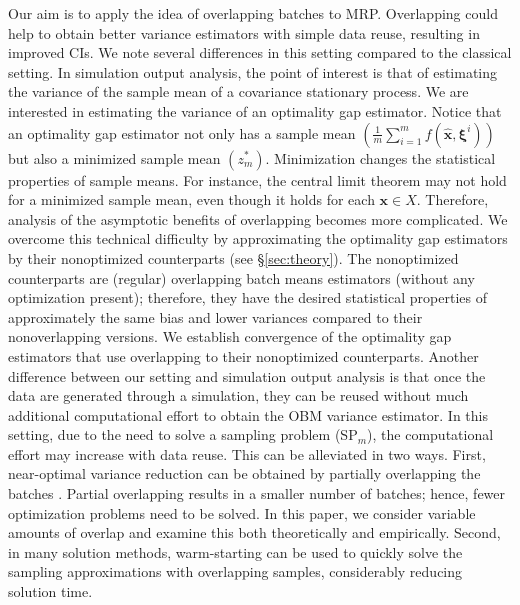 \documentclass[12pt]{article}
\newcommand{\X}{X}
\newcommand{\x}{\mathbf{x}}
\newcommand{\xh}{{\hat{\x}}}
\newcommand{\xit}{\boldsymbol{\xi}}
\newcommand{\xiti}{\xit^i}
\newcommand{\zs}{z^*}
\begin{document}
Our aim is to apply the idea of overlapping batches to MRP.  
Overlapping could help to obtain better variance estimators with simple data reuse, resulting in improved CIs.
We note several differences in this setting compared to the classical setting.  
In simulation output analysis, the point of interest is that of estimating the variance of the sample mean of a covariance stationary process.  
We are interested in estimating the variance of an optimality gap estimator.  
Notice that an optimality gap estimator not only has a sample mean $(\frac{1}{m} \sum_{i=1}^m f(\xh,\xiti))$ but also a minimized sample mean $(\zs_m)$.  
Minimization changes the statistical properties of sample means.  
For instance, the central limit theorem may not hold for a minimized sample mean, even though it holds for each $\x \in \X$.  
Therefore, analysis of the asymptotic benefits of overlapping becomes more complicated.
We overcome this technical difficulty by approximating the optimality gap estimators by their nonoptimized counterparts (see \S \ref{sec:theory}).  
The nonoptimized counterparts are (regular) overlapping batch means estimators (without any optimization present); therefore, they have the desired statistical properties of approximately the same bias and lower variances compared to their nonoverlapping versions. 
We establish convergence of the optimality gap estimators that use overlapping to their nonoptimized counterparts. 
Another difference between our setting and simulation output analysis is that once the data are generated through a simulation, they can be reused without much additional computational effort to obtain the OBM variance estimator.  
In this setting, due to the need to solve a sampling problem (SP$_m$), the computational effort may increase with data reuse.  
This can be alleviated in two ways. 
First, near-optimal variance reduction can be obtained by partially overlapping the batches \citep{Welch1987,Song1992}.  
Partial overlapping results in a smaller number of batches; hence, fewer optimization problems need to be solved.
In this paper, we consider variable amounts of overlap and examine this both theoretically and empirically. 
Second, in many solution methods, warm-starting can be used to quickly solve the sampling approximations with overlapping samples, considerably reducing solution time.




\end{document}
